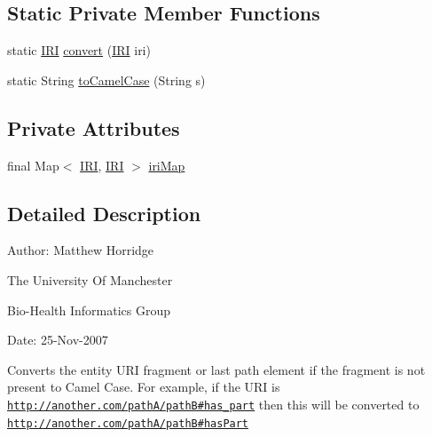 \subsection*{Static Private Member Functions}
\begin{DoxyCompactItemize}
\item 
static \hyperlink{classorg_1_1semanticweb_1_1owlapi_1_1model_1_1_i_r_i}{I\-R\-I} \hyperlink{classorg_1_1semanticweb_1_1owlapi_1_1util_1_1_o_w_l_entity_u_r_i_underscores2_camel_back_converter_strategy_a40354956b03d0fc5503082d4d3f2af70}{convert} (\hyperlink{classorg_1_1semanticweb_1_1owlapi_1_1model_1_1_i_r_i}{I\-R\-I} iri)
\item 
static String \hyperlink{classorg_1_1semanticweb_1_1owlapi_1_1util_1_1_o_w_l_entity_u_r_i_underscores2_camel_back_converter_strategy_a83458ca0d2b94533fbc0a3a758be15a0}{to\-Camel\-Case} (String s)
\end{DoxyCompactItemize}
\subsection*{Private Attributes}
\begin{DoxyCompactItemize}
\item 
final Map$<$ \hyperlink{classorg_1_1semanticweb_1_1owlapi_1_1model_1_1_i_r_i}{I\-R\-I}, \hyperlink{classorg_1_1semanticweb_1_1owlapi_1_1model_1_1_i_r_i}{I\-R\-I} $>$ \hyperlink{classorg_1_1semanticweb_1_1owlapi_1_1util_1_1_o_w_l_entity_u_r_i_underscores2_camel_back_converter_strategy_a1e33c1e6269a4e037fc28f11563c145c}{iri\-Map}
\end{DoxyCompactItemize}


\subsection{Detailed Description}
Author\-: Matthew Horridge\par
 The University Of Manchester\par
 Bio-\/\-Health Informatics Group\par
 Date\-: 25-\/\-Nov-\/2007\par
\par


Converts the entity U\-R\-I fragment or last path element if the fragment is not present to Camel Case. For example, if the U\-R\-I is \href{http://another.com/pathA/pathB#has_part}{\tt http\-://another.\-com/path\-A/path\-B\#has\-\_\-part} then this will be converted to \href{http://another.com/pathA/pathB#hasPart}{\tt http\-://another.\-com/path\-A/path\-B\#has\-Part} 

